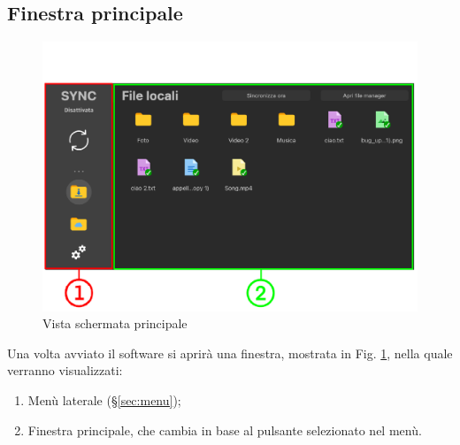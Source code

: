 \subsection{Finestra principale}
\label{sec:principale}
\begin{figure}[H]
    \centering
    \includegraphics[scale = 0.7]{components/img/Principale.png}
    \caption{Vista schermata principale}
    \label{fig:principale}
\end{figure}
Una volta avviato il software si aprirà una finestra,  mostrata in Fig. \ref{fig:principale}, nella quale verranno visualizzati: 
\begin{enumerate}
\item Menù laterale (\S{}\ref{sec:menu});\
\item Finestra principale, che cambia in base al pulsante selezionato nel menù.\
\end{enumerate}



